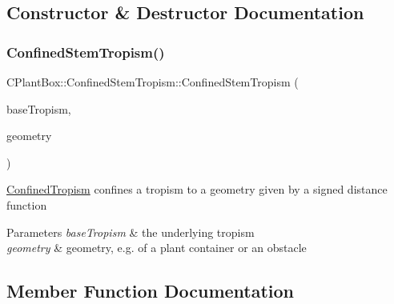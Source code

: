 \subsection{Constructor \& Destructor Documentation}
\mbox{\label{classCPlantBox_1_1ConfinedStemTropism_a20fe8bddeb8063c0d2649bb8ae609a25}} 
\subsubsection{\texorpdfstring{Confined\+Stem\+Tropism()}{ConfinedStemTropism()}}
{\footnotesize\ttfamily C\+Plant\+Box\+::\+Confined\+Stem\+Tropism\+::\+Confined\+Stem\+Tropism (\begin{DoxyParamCaption}\item[{\hyperlink{classCPlantBox_1_1StemTropismFunction}{Stem\+Tropism\+Function} $\ast$}]{base\+Tropism,  }\item[{\hyperlink{classCPlantBox_1_1SignedDistanceFunction}{Signed\+Distance\+Function} $\ast$}]{geometry }\end{DoxyParamCaption})\hspace{0.3cm}{\ttfamily [inline]}}

\hyperlink{classCPlantBox_1_1ConfinedTropism}{Confined\+Tropism} confines a tropism to a geometry given by a signed distance function


\begin{DoxyParams}{Parameters}
{\em base\+Tropism} & the underlying tropism \\
\hline
{\em geometry} & geometry, e.\+g. of a plant container or an obstacle \\
\hline
\end{DoxyParams}


\subsection{Member Function Documentation}
\mbox{\label{classCPlantBox_1_1ConfinedStemTropism_a4c662d9319b16894fca6e5ec30461312}} 
